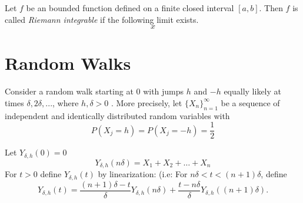 \documentclass[
]{book}
\theoremstyle{definition}
\theoremstyle{definition}
\theoremstyle{definition}
\theoremstyle{definition}
\theoremstyle{remark}
\begin{document}
Let \(f\) be an bounded function defined on a finite closed interval \([a, b]\). Then \(f\) is called \emph{Riemann integrable} if the following limit exists.
\begin{equation}
x
\end{equation}

\section{Random Walks}\label{random-walks}

Consider a random walk starting at 0 with jumps \(h\) and \(-h\) equally likely at times \(\delta, 2\delta,...\), where \(h,\delta>0\) . More precisely, let \(\{X_n\}_{n=1}^\infty\) be a sequence of independent and identically distributed random variables with
\[P(X_j = h) = P(X_j = −h) = \frac{1}{2}\]

Let \(Y_{\delta,h}(0) =0\)
\[Y_{\delta,h}(n\delta) = X_1 + X_2 + \ldots + X_n\]
For \(t > 0\) define \(Y_{\delta,h}(t)\) by linearization:
(i.e: For \(n\delta < t < (n + 1)\delta\), define
\[Y_{\delta,h}(t) = \frac{(n + 1)\delta - t}{\delta} Y_{\delta,h}(n\delta) + \frac{t - n\delta}{\delta} Y_{\delta,h}((n + 1)\delta).\]

  
\end{document}
